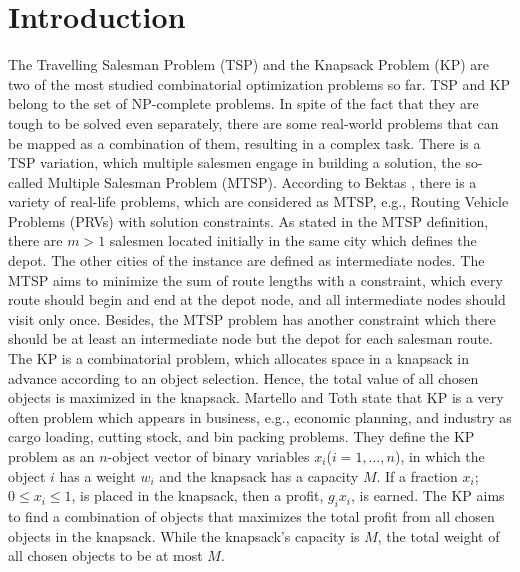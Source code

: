 \documentclass[runningheads]{llncs}
\begin{document}
\section{Introduction}
The Travelling Salesman Problem (TSP) and the Knapsack Problem (KP) are two of the most studied combinatorial optimization problems so far. TSP and KP belong to the set of NP-complete problems. In spite of the fact that they are tough to be solved even separately, there are some real-world problems that can be mapped as a combination of them, resulting in a complex task.
There is a TSP variation, which multiple salesmen engage in building a solution, the so-called Multiple Salesman Problem (MTSP). According to Bektas \cite{bektas2006multiple}, there is a variety of real-life problems, which are considered as MTSP, e.g., Routing Vehicle Problems (PRVs) with solution constraints. As stated in the MTSP definition, there are \(m > 1\) salesmen located initially in the same city which defines the depot. The other cities of the instance are defined as intermediate nodes. The MTSP aims to minimize the sum of route lengths with a constraint, which every route should begin and end at the depot node, and all intermediate nodes should visit only once. Besides, the MTSP problem has another constraint which there should be at least an intermediate node but the depot for each salesman route.
The KP is a combinatorial problem, which allocates space in a knapsack in advance according to an object selection. Hence, the total value of all chosen objects is maximized in the knapsack. Martello and Toth \cite{Martello:1990:KPA:98124} state that KP is a very often problem which appears in business, e.g., economic planning, and industry as cargo loading, cutting stock, and bin packing problems. They define the KP problem as an \(n\)-object vector of binary variables \(x_i\)(\(i=1,\ldots,n\)), in which the object \(i\) has a weight \(w_i\) and the knapsack has a capacity \(M\). If a fraction \(x_i\); \(0 \leq x_i \leq 1\), is placed in the knapsack, then a profit, \(g_i x_i\), is earned. The KP aims to find a combination of objects that maximizes the total profit from all chosen objects in the knapsack. While the knapsack's capacity is \(M\), the total weight of all chosen objects to be at most \(M\).
\end{document}
